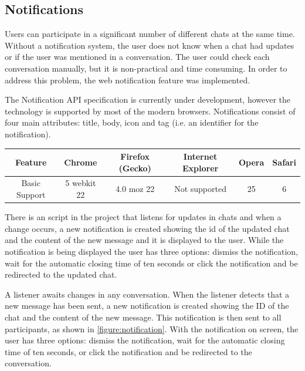 \documentclass[a4paper]{l3proj}
\begin{document}
\subsection{Notifications}
\label{notifications}

Users can participate in a significant number of different chats at the same time. Without a notification system, the user does not know when a chat had updates or if the user was mentioned in a conversation. The user could check each conversation manually, but it is non-practical and time consuming. In order to address this problem, the web notification feature was implemented.

The Notification API specification \cite{site:mdnNotifications} is currently under development, however the technology is supported by most of the modern browsers. Notifications consist of four main attributes: title, body, icon and tag (i.e. an identifier for the notification).

\begin{table}[h]
\begin{tabular}{|c|c|c|c|c|c|}
\hline
\textbf{Feature} & \textbf{Chrome} & \textbf{Firefox (Gecko)} & \textbf{Internet Explorer} & \textbf{Opera} & \textbf{Safari} \\ \hline
Basic Support    & 5 webkit 22     & 4.0 moz 22               & Not supported              & 25             & 6               \\ \hline
\end{tabular}
\end{table}

There is an script in the project that listens for updates in chats and when a change occurs, a new notification is created showing the id of the updated chat and the content of the new message and it is displayed to the user. While the notification is being displayed the user has three options: dismiss the notification, wait for the automatic closing time of ten seconds or click the notification and be redirected to the updated chat.

A listener awaits changes in any conversation. When the listener detects that a new message has been sent, a new notification is created showing the ID of the chat and the content of the new message. This notification is then sent to all participants, as shown in \autoref{figure:notification}. With the notification on screen, the user has three options: dismiss the notification, wait for the automatic closing time of ten seconds, or click the notification and be redirected to the conversation.
\end{document}
